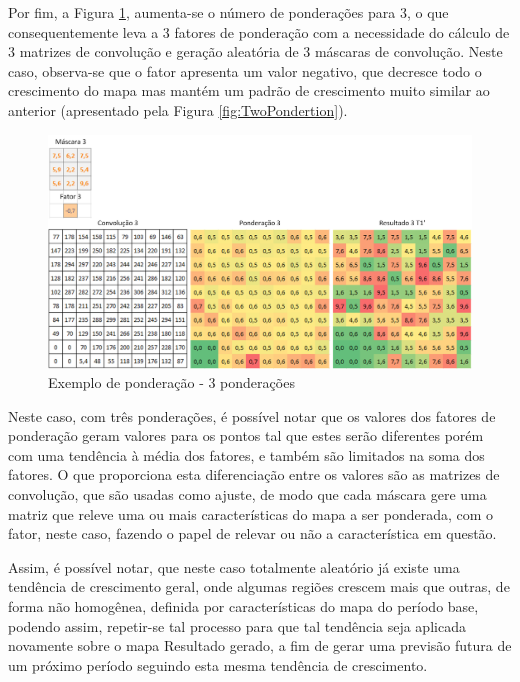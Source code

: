 Por fim, a Figura \ref{fig:TreePondertion}, aumenta-se o número de ponderações para 3, o que consequentemente leva a 3 fatores de ponderação com a necessidade do cálculo de 3 matrizes de convolução e geração aleatória de 3 máscaras de convolução. Neste caso, observa-se que o fator apresenta um valor negativo, que decresce todo o crescimento do mapa mas mantém um padrão de crescimento muito similar ao anterior (apresentado pela Figura \ref{fig:TwoPondertion}). 

\begin{figure}[h]
	\centering	\includegraphics[scale=0.6]{Figuras/PonderationsExample-3Ponderations.png}
	\caption{Exemplo de ponderação - 3 ponderações}
	\label{fig:TreePondertion}
\end{figure}

Neste caso, com três ponderações, é possível notar que os valores dos fatores de ponderação geram valores para os pontos tal que estes serão diferentes porém com uma tendência à média dos fatores, e também são limitados na soma dos fatores. O que proporciona esta diferenciação entre os valores são as matrizes de convolução, que são usadas como ajuste, de modo que cada máscara gere uma matriz que releve uma ou mais características do mapa a ser ponderada, com o fator, neste caso, fazendo o papel de relevar ou não a característica em questão. 

Assim, é possível notar, que neste caso totalmente aleatório já existe uma tendência de crescimento geral, onde algumas regiões crescem mais que outras, de forma não homogênea, definida por características do mapa do período base, podendo assim, repetir-se tal processo para que tal tendência seja aplicada novamente sobre o mapa Resultado gerado, a fim de gerar uma previsão futura de um próximo período seguindo esta mesma tendência de crescimento. 

